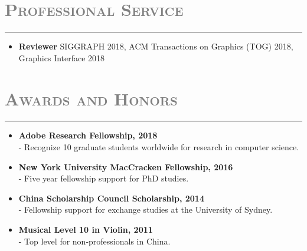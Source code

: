 \documentclass[letterpaper,11pt]{article}
\newcommand{\resheading}[1]{
\vspace{0pt}
\section*{\scshape \textcolor{gray}{#1}}
\rule{\textwidth}{0.5pt}
  \vspace{-15pt}
}
\begin{document}
\resheading{Professional Service}
\vspace{-2pt}
\begin{itemize}[label=,leftmargin=*]
\item \textbf{Reviewer}
SIGGRAPH 2018,
ACM Transactions on Graphics (TOG) 2018,
Graphics Interface 2018
\end{itemize}
\resheading{Awards and Honors}
	\vspace{-2pt}
\begin{itemize}[label=,leftmargin=*,itemsep=-1.5pt]
\item \textbf{Adobe Research Fellowship, 2018}\\
- Recognize 10 graduate students worldwide for research in computer science.
\item
\textbf{New York University MacCracken Fellowship, 2016}\\
- Five year fellowship support for PhD studies.
\item
\textbf{China Scholarship Council Scholarship, 2014}\\
- Fellowship support for exchange studies at the University of Sydney.
\item
\textbf{Musical Level 10 in Violin, 2011}\\
- Top level for non-professionals in China.
\end{itemize}
\end{document}
